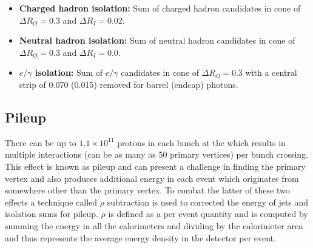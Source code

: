 \begin{itemize}
  \item{\textbf{Charged hadron isolation:} Sum of charged hadron \PF candidates \ET in cone of $\Delta R_{O}=0.3$ and $\Delta R_{I}=0.02$.} 
  \item{\textbf{Neutral hadron isolation:} Sum of neutral hadron \PF candidates \ET in cone of $\Delta R_{O}=0.3$ and $\Delta R_{I}=0.0$.}
  \item{\textbf{$e/\gamma$ isolation:} Sum of $e/\gamma$ \PF candidates \ET in cone of $\Delta R_{O}=0.3$ with a central \eta strip of 0.070 (0.015) removed for barrel (endcap) photons.}
\end{itemize}

\subsection{Pileup}
\label{sec:pileup}

There can be up to $1.1\times10^{11}$ protons in each bunch at the \LHC which results in multiple interactions (can be as many as 50 primary vertices) per bunch crossing. This effect is known as pileup and can present a challenge in finding the primary vertex and also produces additional energy in each event which originates from somewhere other than the primary vertex. To combat the latter of these two effects a technique called $\rho$ subtraction is used to corrected the energy of jets and isolation sums for pileup. $\rho$ is defined as a per event quantity and is computed by summing the energy in all the calorimeters and dividing by the calorimeter area and thus represents the average energy density in the detector per event.




